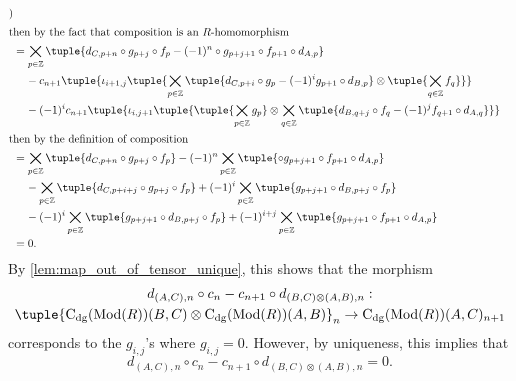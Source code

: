 \begin{remark}
\begin{enumerate}
{\begin{align*}
                ) \\
                \intertext{then by the fact that composition is an \( R \)-homomorphism}
                &= \bigtimes_{p \in \Zb}\tuple{
                    d_{C, p + n} \circ g_{p + j} \circ f_p - (-1)^n \circ g_{p + j + 1} \circ f_{p + 1} \circ d_{A, p}
                } \\
                &\hspace{0.4cm} - c_{n + 1} \tuple{
                    \iota_{i + 1, j}\tuple{              
                        \bigtimes_{p \in \Zb} \tuple{
                            d_{C, p + i} \circ g_p - (-1)^i g_{p + 1} \circ d_{B, p}
                        } \otimes \tuple{ \bigtimes_{q \in \Zb} f_q }
                    }
                } \\
                &\hspace{0.4cm} - (-1)^i c_{n + 1} \tuple{
                    \iota_{i, j + 1}\tuple{
                        \tuple{ \bigtimes_{p \in \Zb} g_p } \otimes \bigtimes_{q \in \Zb}\tuple{
                            d_{B, q + j} \circ f_q - (-1)^j f_{q + 1} \circ d_{A, q}
                        }
                    }
                } \\
                \intertext{then by the definition of composition}
                &= \bigtimes_{p \in \Zb}\tuple{
                    d_{C, p + n} \circ g_{p + j} \circ f_p
                } - (-1)^n \bigtimes_{p \in \Zb}\tuple{
                    \circ g_{p + j + 1} \circ f_{p + 1} \circ d_{A, p}
                } \\
                &\hspace{0.4cm} - \bigtimes_{p \in \Zb}\tuple{
                    d_{C, p + i + j} \circ g_{p + j} \circ f_p
                } + (-1)^i \bigtimes_{p \in \Zb}\tuple{
                    g_{p + j + 1} \circ d_{B, p + j} \circ f_p
                } \\
                &\hspace{0.4cm} - (-1)^i \bigtimes_{p \in \Zb} \tuple{
                    g_{p + j + 1} \circ d_{B, p + j} \circ f_p
                } + (-1)^{i + j} \bigtimes_{p \in \Zb} \tuple{
                    g_{p + j + 1} \circ f_{p + 1} \circ d_{A, p}
                } \\
                &= 0.
            \end{align*}
            By \autoref{lem:map_out_of_tensor_unique}, this shows that the morphism
            \begin{multline*}
                d_{(A, C), n} \circ c_n - c_{n + 1} \circ d_{(B, C) \otimes (A, B), n}: \\
                \tuple{ \C_{\dg}(\Mod(R))(B, C) \otimes \C_{\dg}(\Mod(R))(A, B) }_n \to \C_{\dg}(\Mod(R))(A, C)_{n + 1}
            \end{multline*}             
            corresponds to the \( g_{i,j} \)'s where \( g_{i, j} = 0 \). However, by uniqueness, this implies that
            \[
                d_{(A, C), n} \circ c_n - c_{n + 1} \circ d_{(B, C) \otimes (A, B), n} = 0.
            \]
        }
    \end{enumerate}
\end{remark}

